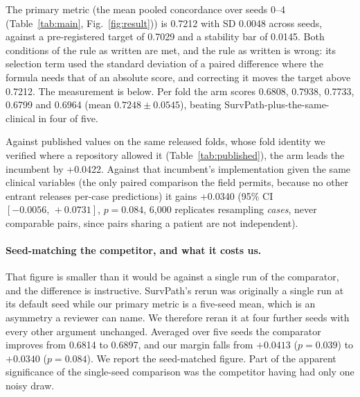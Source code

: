 \documentclass[unnumsec,webpdf,contemporary,large]{oup-authoring-template}
\begin{document}
The primary metric (the mean pooled concordance over seeds 0--4 (Table~\ref{tab:main}, Fig.~\ref{fig:result})) is 0.7212 with SD 0.0048 across seeds, against a pre-registered target of 0.7029 and a stability bar of 0.0145. Both conditions of the rule as written are met, and the rule as written is wrong: its selection term used the standard deviation of a paired difference where the formula needs that of an absolute score, and correcting it moves the target above 0.7212. The measurement is below. Per fold the arm scores 0.6808, 0.7938,
0.7733, 0.6799 and 0.6964 (mean $0.7248 \pm 0.0545$), beating SurvPath-plus-the-same-clinical in
four of five.

Against published values on the same released folds, whose fold identity we verified where a
repository allowed it (Table~\ref{tab:published}), the arm leads the incumbent by
+0.0422. Against that incumbent's implementation given the same clinical variables (the only paired comparison the field permits, because no other entrant releases per-case predictions)
it gains +0.0340 (95\% CI $[-0.0056,\,+0.0731]$, $p=0.084$, 6{,}000 replicates resampling
\emph{cases}, never comparable pairs, since pairs sharing a patient are not independent).

\paragraph{Seed-matching the competitor, and what it costs us.} That figure is smaller than it
would be against a single run of the comparator, and the difference is instructive. SurvPath's
rerun was originally a single run at its default seed while our primary metric is a five-seed mean,
which is an asymmetry a reviewer can name. We therefore reran it at four further seeds with every
other argument unchanged. Averaged over five seeds the comparator improves from 0.6814 to
0.6897, and our margin falls from $+0.0413$ ($p=0.039$) to $+0.0340$ ($p=0.084$). We
report the seed-matched figure. Part of the apparent significance of the single-seed
comparison was the competitor having had only one noisy draw.
\end{document}

